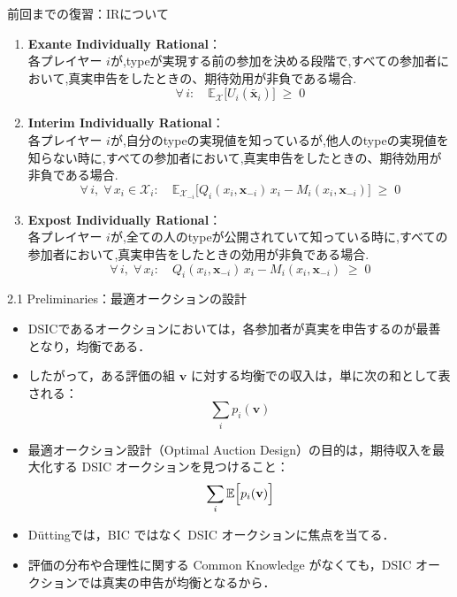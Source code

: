 \documentclass[dvipdfmx,autodetect-engine]{beamer}
\begin{document}
\begin{frame}{前回までの復習：IRについて}
  \small
  \begin{enumerate}
  \item \textbf{Ex\textendash{}ante Individually Rational}：\\
   各プレイヤー \(i\)が,typeが実現する前の参加を決める段階で,すべての参加者において,真実申告をしたときの、期待効用が非負である場合.
  \begin{equation*}
    \forall\,i:\quad
    \mathbb{E}_{\mathcal{X}}\bigl[U_i(\widetilde{\mathbf{x}_i})\bigr]\;\ge\;0
  \end{equation*}

  \vspace{1ex}
  \item \textbf{Interim Individually Rational}：\\
  各プレイヤー \(i\)が,自分のtypeの実現値を知っているが,他人のtypeの実現値を知らない時に,すべての参加者において,真実申告をしたときの、期待効用が非負である場合.
  \begin{equation*}
    \forall\,i,\;\forall\,x_i\in\mathcal{X}_i:\quad
    \mathbb{E}_{\mathcal{X}_{-i}}\bigl[Q_i(x_i,\mathbf{x}_{-i})\,x_i - M_i(x_i,\mathbf{x}_{-i})\bigr]\;\ge\;0
  \end{equation*}

  \vspace{1ex}
  \item \textbf{Ex\textendash{}post Individually Rational}：\\
  各プレイヤー \(i\)が,全ての人のtypeが公開されていて知っている時に,すべての参加者において,真実申告をしたときの効用が非負である場合.
  \begin{equation*}
    \forall\,i,\;\forall\,x_i:\quad
    Q_i(x_i,\mathbf{x}_{-i})\,x_i - M_i(x_i,\mathbf{x}_{-i})\;\ge\;0
  \end{equation*}
  \end{enumerate}
\end{frame}

\begin{frame}{2.1  Preliminaries：最適オークションの設計}
  \small
  \begin{itemize}
    \item DSICであるオークションにおいては，各参加者が真実を申告するのが最善となり，均衡である．
    \item したがって，ある評価の組 $\mathbf{v}$ に対する均衡での収入は，単に次の和として表される：
    \[
      \sum_i p_i(\mathbf{v})
    \]
    \item 最適オークション設計（Optimal Auction Design）の目的は，期待収入を最大化する DSIC オークションを見つけること：
    \[
      \sum_{i} \mathbb{E}\Bigl[p_i(\mathbf{v})\Bigr]
    \]
    \item Düttingでは，BIC ではなく DSIC オークションに焦点を当てる．
    \item 評価の分布や合理性に関する Common Knowledge がなくても，DSIC オークションでは真実の申告が均衡となるから．
  \end{itemize}
\end{frame}
\end{document}
